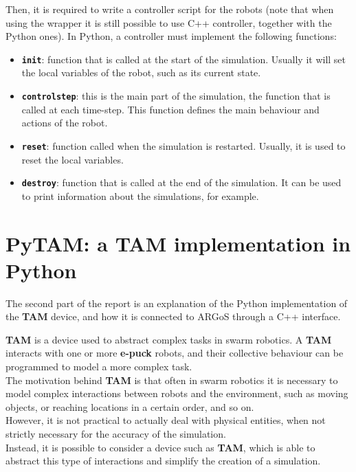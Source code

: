 \documentclass[
12pt,
a4paper,
oneside,
headinclude,
footinclude]{article}
\theoremstyle{definition} %
\begin{document}
Then, it is required to write a controller script for the robots (note that when using the wrapper it is still possible to use C++ controller, together with the Python ones).
In Python, a controller must implement the following functions:

\begin{itemize}
    \item \textbf{\texttt{init}}: function that is called at the start of the simulation. Usually it will set the local variables of the robot, such as its current state.
    \item \textbf{\texttt{controlstep}}: this is the main part of the simulation, the function that is called at each time-step. This function defines the main behaviour and actions of the robot.
    \item \textbf{\texttt{reset}}: function called when the simulation is restarted. Usually, it is used to reset the local variables.
    \item \textbf{\texttt{destroy}}: function that is called at the end of the simulation. It can be used to print information about the simulations, for example.
\end{itemize}

\newpage

\section{PyTAM: a TAM implementation in Python}
The second part of the report is an explanation of the Python implementation of the \textbf{TAM} device, and how it is connected to ARGoS through a C++ interface.

\textbf{TAM} \cite{brutschy2015tam} is a device used to abstract complex tasks in swarm robotics. A \textbf{TAM} interacts with one or more \textbf{e-puck} robots, and their collective behaviour can be programmed to model a more complex task. \\
The motivation behind \textbf{TAM} is that often in swarm robotics it is necessary to model complex interactions between robots and the environment, such as moving objects, or reaching locations in a certain order, and so on.\\
However, it is not practical to actually deal with physical entities, when not strictly necessary for the accuracy of the simulation.\\
Instead, it is possible to consider a device such as \textbf{TAM}, which is able to abstract this type of interactions and simplify the creation of a simulation.
\end{document}
